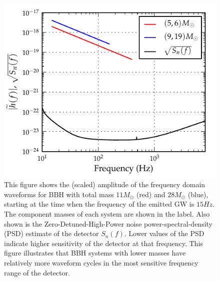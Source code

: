 \documentclass[aps,
prd,
amsmath,
amssymb,
twocolumn,
floatfix,
groupedaddress]{revtex4-1}
\begin{document}
\begin{figure}
\centering
\includegraphics[scale=0.04, clip=false, totalheight=0.3\textheight, width=\columnwidth]{fd_fd_psd.pdf}
\caption{\label{fig:F2waveformsM}This figure shows the (scaled) amplitude of the frequency domain waveforms for BBH with total mass $11M_{\odot}$ (red) and $28M_{\odot}$ (blue), starting at the time when the frequency of the emitted GW is $15Hz$. The component masses of each system are shown in the label. Also shown is the Zero-Detuned-High-Power noise power-spectral-density (PSD) estimate of the detector $S_n(f)$. Lower values of the PSD indicate higher sensitivity of the detector at that frequency. This figure illustrates that BBH systems with lower masses have relatively more waveform cycles in the most sensitive frequency range of the detector.}
\end{figure}
\end{document}
